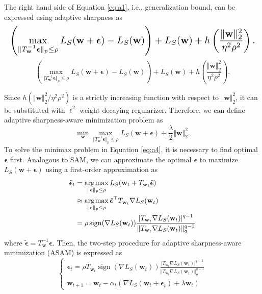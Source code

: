 \documentclass{article}
\DeclareMathOperator*{\argmax}{\arg\hspace{-0.07em}\max}
\newcommand{\mf}[1]{\mathbf{#1}}
\begin{document}
The right hand side of Equation \ref{eq:a1}, i.e., generalization bound, can be expressed using adaptive sharpness as
\ificml
    \begin{equation*}
    \resizebox{\hsize}{!}{$\displaystyle\left(\max_{\Vert T^{-1}_\mf{w} \bm{\epsilon}\Vert _{p} \leq \rho } L_{S}(\mf{w}+\bm{\epsilon}) - L_S(\mf{w})\right) + L_S(\mf{w}) + h\left(\frac{\Vert \mf{w}\Vert _{2}^2}{\eta^2 \rho^2}\right).$}
    \end{equation*}
\else
    \begin{equation*}
    \left(\max_{\Vert T^{-1}_\mf{w} \bm{\epsilon}\Vert _{p} \leq \rho } L_{S}(\mf{w}+\bm{\epsilon}) - L_S(\mf{w})\right) + L_S(\mf{w}) + h\left(\frac{\Vert \mf{w}\Vert _{2}^2}{\eta^2 \rho^2}\right).
    \end{equation*}
\fi

Since $h\left(\Vert \mf{w}\Vert _{2}^2 / \eta^2 \rho^2 \right)$ is a strictly increasing function with respect to $\Vert \mf{w}\Vert _2^2$, it can be substituted with $\ell^2$ weight decaying regularizer. Therefore, we can define adaptive sharpness-aware minimization problem as
\begin{equation}\label{eq:a4}
    \min_{\mf{w}} \max_{\Vert T^{-1}_\mf{w} \bm{\epsilon}\Vert_{p} \leq \rho } L_{S}(\mf{w}+\bm{\epsilon}) + \frac{\lambda}{2}\Vert \mf{w}\Vert _2^2.
\end{equation}
To solve the minimax problem in Equation \ref{eq:a4}, it is necessary to find optimal $\bm{\epsilon}$ first.
Analogous to SAM, we can approximate the optimal $\bm{\epsilon}$ to maximize $L_{S}(\mf{w}+\bm{\epsilon})$ using a first-order approximation as
\begin{align*}
    \tilde{\bm{\epsilon}}_{t} 
    & = \argmax_{\Vert \tilde{\bm{\epsilon}} \Vert _{p} \leq \rho } L_{S}(\mf{w}_t + T_{\mf{w}_t} \tilde{\bm{\epsilon}}) \\
    & \approx \argmax_{\Vert \tilde{\bm{\epsilon}}\Vert _{p} \leq \rho } \tilde{\bm{\epsilon}}^\top T_{\mf{w}_t} \nabla L_S(\mf{w}_t) \\
    & = \rho \operatorname{sign}(\nabla L_S(\mf{w}_t)) \frac {\displaystyle \vert T_{\mf{w}_t} \nabla L_S(\mf{w}_t) \vert^{q-1}} {\displaystyle \Vert T_{\mf{w}_t} \nabla L_S(\mf{w}_t) \Vert^{q-1}_q}
\end{align*}
\noindent where $\tilde{\bm{\epsilon}} = T^{-1}_{\mf{w}} \bm{\epsilon}.$
Then, the two-step procedure for adaptive sharpness-aware minimization (ASAM) is expressed as
\begin{equation*}
  \left\{
    \begin{array}{ll}
      \bm{\epsilon}_{t} = \rho T_{\mf{w}_t}\operatorname{sign}(\nabla L_S(\mf{w}_t)) \frac {\displaystyle \vert T_{\mf{w}_t} \nabla L_S(\mf{w}_t) \vert^{q-1}} {\displaystyle \Vert T_{\mf{w}_t} \nabla L_S(\mf{w}_t) \Vert^{q-1}_q} \\
      \mf{w}_{t+1} = \mf{w}_t - \alpha_t \left( \nabla L_S(\mf{w}_t + \bm{\epsilon}_{t}) + \lambda \mf{w}_t \right)
    \end{array}
  \right.
\end{equation*}
\end{document}
